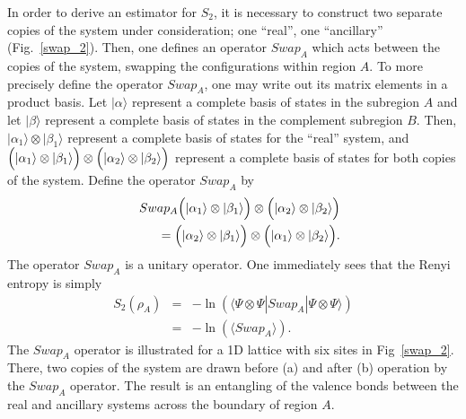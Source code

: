 \documentclass[prl,aps,twocolumn,floatfix,amsmath,amssymb,superscriptaddress,tightenlines]{revtex4}
\begin{document}
In order to derive an estimator for $S_2$, it is necessary to construct two separate copies of the
system under consideration; one ``real'', one ``ancillary'' (Fig.~\ref{swap_2}).
Then, one defines an
operator $Swap_A$ which acts between the copies of the system, swapping the
configurations within region $A$.  To more precisely define the operator
$Swap_A$, one may write out its matrix elements in a product basis.
Let $|\alpha\rangle$  represent a complete basis of states in the subregion
$A$ and let $|\beta\rangle$ represent a complete basis of states in
the complement subregion $B$.  Then, $|\alpha_1 \rangle \otimes |\beta_1 \rangle$ represent
a complete basis of states for the ``real'' system, and
$\Bigl( |\alpha_1\rangle \otimes |\beta_1\rangle \Bigr) \otimes
\Bigl( |\alpha_2\rangle \otimes |\beta_2\rangle \Bigr)$
represent a complete basis of states for both copies of the system.
Define the operator $Swap_A$ by
\begin{eqnarray}
&& Swap_A \Bigl( |\alpha_1\rangle \otimes |\beta_1\rangle \Bigr) \otimes
\Bigl( |\alpha_2\rangle \otimes |\beta_2\rangle \Bigr) \nonumber \\ &&=
\Bigl( |\alpha_2\rangle \otimes |\beta_1\rangle \Bigr) \otimes
\Bigl( |\alpha_1\rangle \otimes |\beta_2\rangle \Bigr).
\end{eqnarray}
The operator $Swap_A$ is a unitary operator.
One immediately sees that the Renyi entropy is simply
\begin{eqnarray}
\label{H2fromSwap}
S_2(\rho_A) &=&-\ln(\langle \Psi\otimes \Psi|Swap_A|\Psi\otimes \Psi\rangle) \\
&=&-\ln(\langle Swap_A \rangle). \label{s2}
\end{eqnarray}
The $Swap_A$ operator is illustrated for a 1D lattice with six sites in Fig~\ref{swap_2}.  There, two copies of the system are
drawn before (a) and after (b) operation by the $Swap_A$ operator.  The result is an entangling of the valence bonds between the 
real and ancillary systems across the boundary of region $A$.
\end{document}
